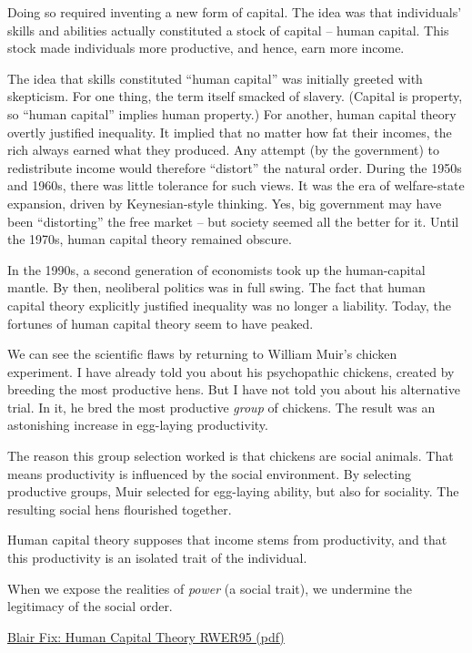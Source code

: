 \documentclass[
]{book}
\begin{document}
Doing so required inventing a new form of capital.
The idea was that individuals' skills and abilities actually constituted a stock of capital --
human capital. This stock made individuals more productive, and hence, earn more income.

The idea that skills constituted ``human capital'' was initially greeted with skepticism. For one
thing, the term itself smacked of slavery. (Capital is property, so ``human capital'' implies
human property.) For another, human capital theory overtly justified inequality. It implied that
no matter how fat their incomes, the rich always earned what they produced. Any attempt (by
the government) to redistribute income would therefore ``distort'' the natural order. During the
1950s and 1960s, there was little tolerance for such views. It was the era of welfare-state
expansion, driven by Keynesian-style thinking. Yes, big government may have been
``distorting'' the free market -- but society seemed all the better for it.
Until the 1970s, human capital theory remained obscure.

In the 1990s, a second generation of economists took up the human-capital mantle. By then,
neoliberal politics was in full swing. The fact that human capital theory explicitly justified
inequality was no longer a liability.
Today, the fortunes of human capital theory seem to have peaked.

We can see the scientific flaws by returning to William Muir's chicken experiment. I have
already told you about his psychopathic chickens, created by breeding the most productive
hens. But I have not told you about his alternative trial. In it, he bred the most productive
\emph{group} of chickens. The result was an astonishing increase in egg-laying productivity.

The reason this group selection worked is that chickens are social animals. That means
productivity is influenced by the social environment. By selecting productive groups, Muir
selected for egg-laying ability, but also for sociality. The resulting social hens flourished
together.

Human capital theory supposes that income stems from productivity, and that this productivity
is an isolated trait of the individual.

When we expose
the realities of \emph{power} (a social trait), we undermine the legitimacy of the social order.

\href{pdf/Fix_2021_Human_Capital_RWER95.pdf}{Blair Fix: Human Capital Theory RWER95 (pdf)}
\end{document}
